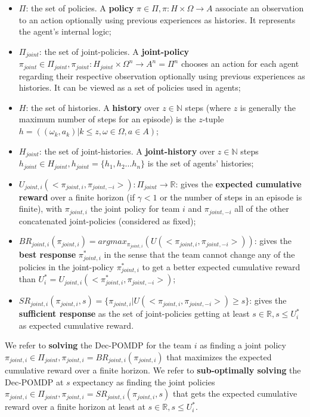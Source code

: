 \documentclass[runningheads]{llncs}
\theoremstyle{freethm}
\theoremstyle{proofoutline}
\begin{document}
\begin{itemize}

    \item $\Pi$: the set of policies. A \textbf{policy} $\pi \in \Pi, \pi: H \times \Omega \rightarrow A$ associate an observation to an action optionally using previous experiences as histories. It represents the agent's internal logic;
    \item $\Pi_{joint}$: the set of joint-policies. A \textbf{joint-policy} $\pi_{joint} \in \Pi_{joint}, \pi_{joint}: H_{joint} \times \Omega^n \rightarrow A^n = \Pi^n$ chooses an action for each agent regarding their respective observation optionally using previous experiences as histories. It can be viewed as a set of policies used in agents;
    \item $H$: the set of histories. A \textbf{history} over $z \in \mathbb{N}$ steps (where $z$ is generally the maximum number of steps for an episode) is the $z$-tuple $h = ((\omega_{k}, a_{k}) | k \leq z, \omega \in \Omega, a \in A)$;
    \item $H_{joint}$: the set of joint-histories. A \textbf{joint-history} over $z \in \mathbb{N}$ steps $h_{joint} \in H_{joint}, h_{joint} = \{h_1,h_2 \dots h_n\}$ is the set of agents' histories;
    \item $U_{joint,i}(<\pi_{joint,i}, \pi_{joint,-i}>): \Pi_{joint} \rightarrow \mathbb{R}$: gives the \textbf{expected cumulative reward} over a finite horizon (if $\gamma < 1$ or the number of steps in an episode is finite), with $\pi_{joint,i}$ the joint policy for team $i$ and $\pi_{joint,-i}$ all of the other concatenated joint-policies (considered as fixed);
    \item $BR_{joint,i}(\pi_{joint,i}) = argmax_{\pi_{joint,i}}(U(<\pi_{joint,i},\pi_{joint,-i}>))$: gives the \textbf{best response} $\pi_{joint,i}^*$ in the sense that the team cannot change any of the policies in the joint-policy $\pi_{joint,i}^*$ to get a better expected cumulative reward than $U_i^* = U_{joint,i}(<\pi_{joint,i}^*, \pi_{joint,-i}>)$;
    \item $SR_{joint,i}(\pi_{joint,i}, s) = \{\pi_{joint,i} | U(<\pi_{joint,i},\pi_{joint,-i}>) \geq s\}$: gives the \textbf{sufficient response} as the set of joint-policies getting at least $s \in \mathbb{R}, s \leq U_i^*$ as expected cumulative reward.
\end{itemize}

We refer to \textbf{solving} the Dec-POMDP for the team $i$ as finding a joint policy $\pi_{joint,i} \in \Pi_{joint}, \pi_{joint,i} = BR_{joint,i}(\pi_{joint,i})$ that maximizes the expected cumulative reward over a finite horizon.
We refer to \textbf{sub-optimally solving} the Dec-POMDP at $s$ expectancy as finding the joint policies $\pi_{joint,i} \in \Pi_{joint}, \pi_{joint,i} = SR_{joint,i}(\pi_{joint,i}, s)$ that gets the expected cumulative reward over a finite horizon at least at $s \in \mathbb{R}, s \leq U_i^*$.
\end{document}
